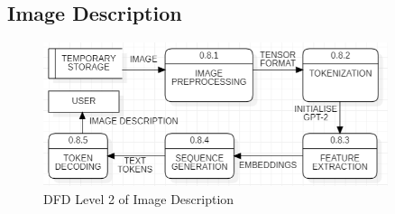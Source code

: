\subsection{Image Description}

\begin{figure}[h!]  
    \centering
    \includegraphics[width=0.9\textwidth]{Images/DFD L2 ID.png}  
    \caption{DFD Level 2 of Image Description}
    \label{dfdl122}  %
\end{figure}


